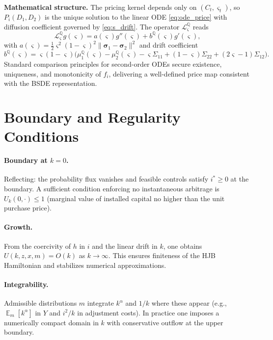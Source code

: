 ﻿\documentclass[11pt,letterpaper,oneside]{article}
\numberwithin{equation}{section}
\DeclareMathOperator{\E}{\mathbb{E}}
\newcommand{\1}{\mathbf{1}}
\begin{document}
\begin{tcolorbox}[mathstyle]
\textbf{Mathematical structure.} The pricing kernel depends only on $(C_t,\varsigma_t)$, so $P_i(D_1,D_2)$ is the unique solution to the linear ODE \eqref{eq:ode_price} with diffusion coefficient governed by \eqref{eq:s_drift}. The operator $\mathcal{L}^{\mathbb{Q}}_{\varsigma}$ reads
\begin{equation*}
  \mathcal{L}^{\mathbb{Q}}_{\varsigma} g(\varsigma) = a(\varsigma) g''(\varsigma) + b^{\mathbb{Q}}(\varsigma) g'(\varsigma),
\end{equation*}
with $a(\varsigma)=\tfrac12 \varsigma^2(1-\varsigma)^2 \lVert \bm{\sigma}_1-\bm{\sigma}_2\rVert^2$ and drift coefficient
\begin{equation*}
  b^{\mathbb{Q}}(\varsigma)=\varsigma(1-\varsigma)\Big(\mu_1^{\mathbb{Q}}(\varsigma)-\mu_2^{\mathbb{Q}}(\varsigma)-\varsigma\Sigma_{11}+(1-\varsigma)\Sigma_{22}+(2\varsigma-1)\Sigma_{12}\Big).
\end{equation*}
Standard comparison principles for second-order ODEs secure existence, uniqueness, and monotonicity of $f_i$, delivering a well-defined price map consistent with the BSDE representation.
\end{tcolorbox}
\section{Boundary and Regularity Conditions}

\paragraph{Boundary at $k=0$.} Reflecting: the probability flux vanishes and feasible controls satisfy $i^*\ge 0$ at the boundary. A sufficient condition enforcing no instantaneous arbitrage is $U_k(0,\cdot)\le 1$ (marginal value of installed capital no higher than the unit purchase price).

\paragraph{Growth.} From the coercivity of $h$ in $i$ and the linear drift in $k$, one obtains $U(k,z,x,m)=O(k)$ as $k\to\infty$. This ensures finiteness of the HJB Hamiltonian and stabilizes numerical approximations.

\paragraph{Integrability.} Admissible distributions $m$ integrate $k^\alpha$ and $1/k$ where these appear (e.g., $\E_m[k^\alpha]$ in $Y$ and $i^2/k$ in adjustment costs). In practice one imposes a numerically compact domain in $k$ with conservative outflow at the upper boundary.
\end{document}
